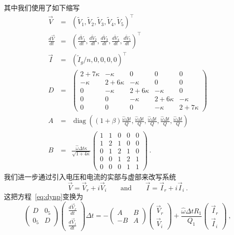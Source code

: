 \documentclass[12pt]{article}
\newcommand\diag{\mathop{\mathrm{diag}}}
\newcommand\tV{\tilde V}
\newcommand\ho{\hat\omega}
\newcommand\dt{\Delta t}
\begin{document}
其中我们使用了如下缩写
\begin{eqnarray}\label{eq:dynpaux}
  \vec V &=& \left(\tV_1,\tV_2,\tV_3,\tV_4,\tV_5\right)^{\top}\nonumber\\
  \frac{d\vec V}{dt} &=&
       \left(\frac{d\tV_1}{dt} , \frac{d\tV_2}{dt} , \frac{d\tV_3}{dt} , 
       \frac{d\tV_4}{dt} , \frac{d\tV_5}{dt} \right)^{\top}\nonumber\\
  \vec I &=& \left(\tilde I_g/n,0,0,0,0\right)^{\top}\nonumber\\
  D&=&\left(\begin{array}{ccccc}
     2+7\kappa & -\kappa & 0 & 0 & 0 \\
     -\kappa & 2+6\kappa & - \kappa & 0 & 0 \\
     0 & -\kappa & 2+6\kappa & - \kappa & 0 \\
     0 & 0 & -\kappa & 2+6\kappa & - \kappa \\
     0 & 0 &  0 &-\kappa & 2+7\kappa
   \end{array}\right)\\
  A&=&\diag\left((1+\beta)\frac{\ho\dt}{Q}, \frac{\ho\dt}{Q}, \frac{\ho\dt}{Q},
       \frac{\ho\dt}{Q}, \frac{\ho\dt}{Q}\right)\nonumber\\
  B&=&\frac{\ho\dt\kappa}{\sqrt{1+4\kappa}}\left(\begin{array}{ccccc}
              1 & 1 & 0 & 0 & 0\\
              1 & 2 & 1 & 0 & 0\\
              0 & 1 & 2 & 1 & 0\\
              0 & 0 & 1 & 2 & 1\\
              0 & 0 & 0 & 1 & 1
 \end{array}\right)\ . \nonumber
\end{eqnarray}
我们进一步通过引入电压和电流的实部与虚部来改写系统
\begin{equation}
  \vec V = \vec V_r + i\vec V_i
  \qquad\mathrm{and}\qquad
  \vec I = \vec I_r + i\vec I_i \ . 
\end{equation}
这把方程~\ref{eq:dynp}变换为
\begin{equation}\label{eq:dynpb}
  \left(\begin{array}{cc} D & 0_5 \\ 0_5 & D\end{array}\right)
  \left(\begin{array}{c} \frac{d\vec V_r}{dt} \\ \frac{d\vec V_i}{dt}\end{array}\right)\dt
  =-\left(\begin{array}{rr} A & B \\ -B & A\end{array}\right)
  \left(\begin{array}{c} \vec V_r \\ \vec V_i\end{array}\right)
  +\frac{\ho\dt R_1}{Q_1} \left(\begin{array}{c} \vec I_r \\ \vec I_i\end{array}\right)\ ,
\end{equation}
\end{document}
